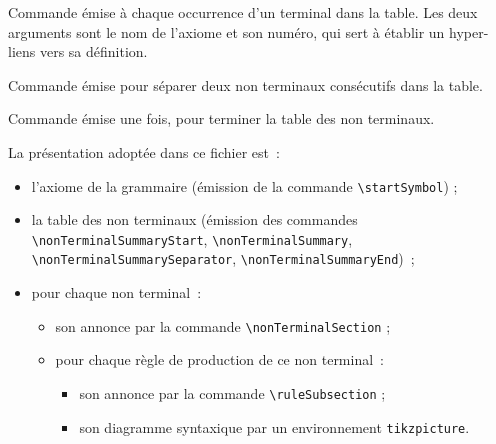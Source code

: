 
Commande émise à chaque occurrence d'un terminal dans la table.  Les deux arguments sont le nom de l'axiome et son numéro, qui sert à établir un hyper-liens vers sa définition.





Commande émise pour séparer deux non terminaux consécutifs dans la table.




Commande émise une fois, pour terminer la table des non terminaux.



La présentation adoptée dans ce fichier est~:
\begin{itemize}
  \item l'axiome de la grammaire (émission de la commande \texttt{\small\textbackslash startSymbol}) ;
  \item la table des non terminaux (émission des commandes \texttt{\small\textbackslash nonTerminalSummaryStart}, \texttt{\small\textbackslash nonTerminalSummary}, \texttt{\small\textbackslash nonTerminalSummarySeparator}, \texttt{\small\textbackslash nonTerminalSummaryEnd})~;
  \item pour chaque non terminal~:
  \begin{itemize}
    \item son annonce par la commande \texttt{\small\textbackslash nonTerminalSection} ;
    \item pour chaque règle de production de ce non terminal~:
    \begin{itemize}
      \item son annonce par la commande \texttt{\small\textbackslash ruleSubsection} ;
      \item son diagramme syntaxique par un environnement \texttt{tikzpicture}.
    \end{itemize}
  \end{itemize}
\end{itemize}



